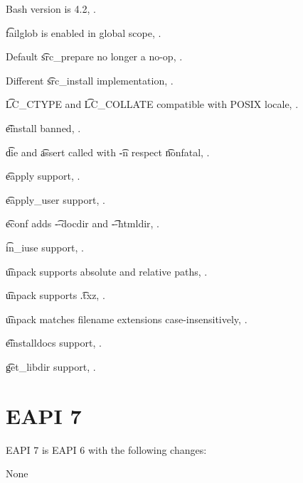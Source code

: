 \begin{compactitem}
\item Bash version is 4.2, .
\item \t{failglob} is enabled in global scope, .
\item Default \t{src_prepare} no longer a no-op, .
\item Different \t{src_install} implementation, .
\item \t{LC_CTYPE} and \t{LC_COLLATE} compatible with POSIX locale, .
\item \t{einstall} banned, .
\item \t{die} and \t{assert} called with \t{-n} respect \t{nonfatal}, .
\item \t{eapply} support, .
\item \t{eapply_user} support, .
\item \t{econf} adds \t{-{}-docdir} and \t{-{}-htmldir}, .
\item \t{in_iuse} support, .
\item \t{unpack} supports absolute and relative paths, .
\item \t{unpack} supports \t{.txz}, .
\item \t{unpack} matches filename extensions case-insensitively, .
\item \t{einstalldocs} support, .
\item \t{get_libdir} support, .
\end{compactitem}

\section{EAPI 7}

EAPI 7 is EAPI 6 with the following changes:

\begin{compactitem}
\item None
\end{compactitem}



